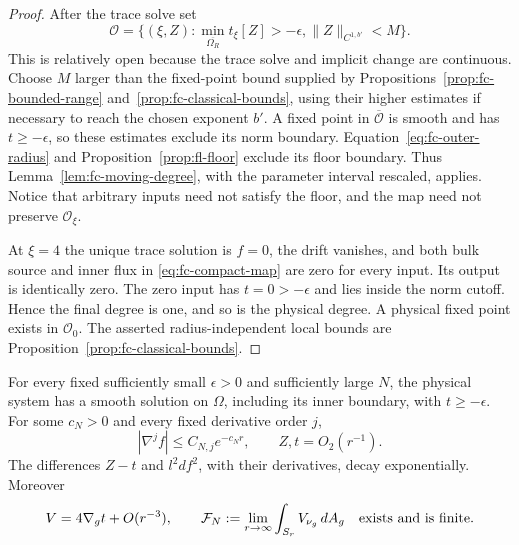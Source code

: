 \begin{proof}
After the trace solve set
\[
 \mathcal O=\{(\xi,Z):
        \min_{\overline{\Omega_R}}t_\xi[Z]>-\epsilon,
                                 \|Z\|_{C^{1,b'}}<M\}.
\]
This is relatively open because the trace solve and implicit
change are continuous.  Choose $M$ larger than the fixed-point
bound supplied by Propositions~\ref{prop:fc-bounded-range}
and~\ref{prop:fc-classical-bounds}, using their higher estimates
if necessary to reach the chosen exponent $b'$.
A fixed point in $\overline{\mathcal O}$ is smooth and has
$t\ge-\epsilon$, so these estimates exclude its norm boundary.
Equation~\eqref{eq:fc-outer-radius} and
Proposition~\ref{prop:fl-floor} exclude its floor boundary.
Thus Lemma~\ref{lem:fc-moving-degree}, with the parameter interval
rescaled, applies.  Notice that arbitrary inputs need not satisfy
the floor, and the map need not preserve $\mathcal O_\xi$.

At $\xi=4$ the unique trace solution is $f=0$, the drift vanishes,
and both bulk source and inner flux in
\eqref{eq:fc-compact-map} are zero for every input.  Its output
is identically zero.  The zero input has $t=0> -\epsilon$ and lies
inside the norm cutoff.  Hence the final degree is one, and so
is the physical degree.  A physical fixed point exists in
$\mathcal O_0$.  The asserted radius-independent local bounds
are Proposition~\ref{prop:fc-classical-bounds}.
\end{proof}

\begin{proposition}
\label{prop:fc-existence}
For every fixed sufficiently small $\epsilon>0$ and sufficiently large $N$, the
physical system has a smooth solution on $\Omega$, including its
inner boundary, with $t\ge-\epsilon$.  For some $c_N>0$ and
every fixed derivative order $j$,
\begin{equation}\label{eq:fc-end-decay}
 |\nabla^j f|\le C_{N,j}e^{-c_Nr},\qquad
 Z,t=O_2(r^{-1}).
\end{equation}
The differences $Z-t$ and $l^2df^2$, with their derivatives, decay
exponentially.  Moreover
\begin{equation}\label{eq:fc-flux-asymptotic}
 V=4\nabla_g t+O(r^{-3}),\qquad
 \mathcal F_N:=\lim_{r\to\infty}\int_{S_r}V_{\nu_g}\,dA_g
 \quad\hbox{exists and is finite}.
\end{equation}
\end{proposition}

